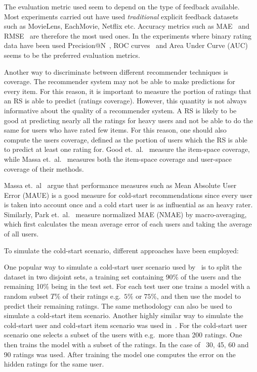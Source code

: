 The evaluation metric used seem to depend on the type of feedback available.
Most experiments carried out have used \emph{traditional} explicit feedback datasets such as
MovieLens, EachMovie, Netflix etc. Accuracy metrics such as MAE~\cite{Rashid2002, Rashid2008, Massa2004,
Massa2007, Stern2009} and RMSE~\cite{Agarwal2009, Agarwal2010} are therefore
the most used ones. In the experiments where binary rating data have been used
Precision@N~\cite{Liu2011, Gantner2010}, ROC curves~\cite{Agarwal2009,
Gantner2010, Schein2002} and Area Under Curve (AUC) \cite{Liu2011, Gantner2010} seems to be the
preferred evaluation metrics.

Another way to discriminate between different recommender techniques is
coverage. The recommender system may not be able to make predictions for every
item. For this reason, it is important to measure the portion of ratings that
an RS is able to predict (ratings coverage). However, this quantity is not
always informative about the quality of a recommender system. A RS is likely to
be good at predicting nearly all the ratings for heavy users and not be able to
do the same for users who have rated few items. For this reason, one should
also compute the users coverage, defined as the portion of users which the RS
is able to predict at least one rating for. Good et.\ al.~\cite{Good1999}
measure the item-space coverage, while Massa et.\ al.~\cite{Massa2004,
Massa2007} measures both the item-space coverage and user-space coverage of
their methods.

Massa et.\ al~\cite{Massa2004} argue that performance measures such as Mean
Absolute User Error (MAUE) is a good measure for cold-start recommendations
since every user is taken into account once and a cold start user is as
influential as an heavy rater. Similarly, Park et.\ al.~\cite{Park2006} measure
normalized MAE (NMAE) by macro-averaging, which first calculates the mean
average error of each users and taking the average of all users.

To simulate the cold-start scenario, different approaches have been employed:

One popular way to simulate a cold-start user scenario used by~\cite{Stern2009,
Lam2008} is to split the dataset in two disjoint sets, a training set
containing 90\% of the users and the remaining 10\% being in the test set. For
each test user one trains a model with a random subset $T\%$ of their ratings
e.g.\ $5\%$ or $75\%$, and then use the model to predict their remaining
ratings. The same methodology can also be used to simulate a cold-start item
scenario. Another highly similar way to simulate the cold-start user and
cold-start item scenario was used in~\cite{Rashid2002, Rashid2008}. For the
cold-start user scenario one selects a subset of the users with e.g.\ more than
200 ratings. One then trains the model with a subset of the ratings. In the
case of~\cite{Rashid2002} 30, 45, 60 and 90 ratings was used. After training
the model one computes the error on the hidden ratings for the same user.

